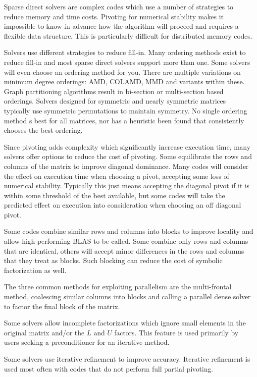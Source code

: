\documentclass[acmtocl]{acmtrans2m}
\begin{document}
\bigskip

Sparse direct solvers are complex codes which use a number of
strategies to reduce memory and time costs.  Pivoting for numerical
stability makes it impossible to know in advance how the algorithm
will proceed and requires a flexible data structure.  This is
particularly difficult for distributed memory codes.  

Solvers use different strategies to reduce fill-in.  Many ordering
methods exist to reduce fill-in and most sparse direct solvers support
more than one.  Some solvers will even choose an ordering method for
you.  There are multiple variations on minimum degree orderings: AMD,
COLAMD, MMD and variants within these.  Graph partitioning algorithms
result in bi-section or multi-section based orderings.  Solvers
designed for symmetric and nearly symmetric matrices typically use
symmetric permutations to maintain symmetry.  No single ordering
method s best for all matrices, nor has a heuristic been found that
consistently chooses the best ordering.

Since pivoting adds complexity which significantly increase execution
time, many solvers offer options to reduce the cost of pivoting.  Some
equilibrate the rows and columns of the matrix to improve diagonal
dominance.  Many codes will consider the effect on execution time when
choosing a pivot, accepting some loss of numerical stability.
Typically this just means accepting the diagonal pivot if it is within
some threshold of the best available, but some codes will take the
predicted effect on execution into consideration when choosing an off
diagonal pivot.

Some codes combine similar rows and columns into blocks to improve
locality and allow high performing BLAS to be called.  Some combine
only rows and columns that are identical, others will accept minor
differences in the rows and columns that they treat as blocks.  Such
blocking can reduce the cost of symbolic factorization as well.

The three common methods for exploiting parallelism are the
multi-frontal method, coalescing  similar 
columns into blocks and calling a parallel dense solver 
to factor the final block of the matrix.

Some solvers allow incomplete factorizations which ignore small
elements in the original matrix and/or the $L$ and $U$ factors.
This feature is used primarily by users seeking a
preconditioner for an iterative method.

Some solvers use iterative refinement to improve accuracy.  Iterative
refinement is used most often with codes that do not perform full partial pivoting.  
\end{document}
